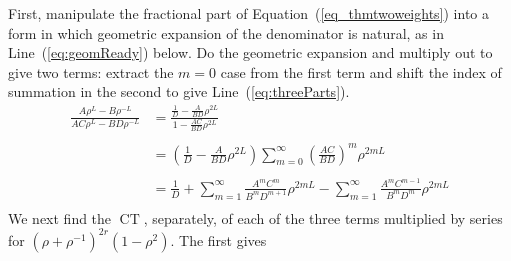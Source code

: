\documentclass[11pt,a4paper]{article}
\DeclareMathOperator{\CT}{CT}
\newcommand{\p}{\rho}
\begin{document}
First, manipulate the fractional part of Equation~(\ref{eq_thmtwoweights}) into a form in which geometric expansion of the denominator is natural, as in Line~(\ref{eq:geomReady}) below.  Do the geometric expansion and multiply out to give two terms: extract the $m=0$ case from the first term and shift the index of summation in the second to give Line~(\ref{eq:threeParts}).
\begin{align}
\frac{A \p^L - B \p^{-L}}{AC \p^L - BD \p ^{-L}}
&=  
\frac{\frac{1}{D}  - \frac{A}{BD} \p^{2L}}{1  - \frac{AC}{BD} \p^{2L}} \label{eq:geomReady}\\
\nonumber \\
&= 
\left(\frac{1}{D}  - \frac{A}{BD} \p^{2L} \right )
\sum_{m=0}^{\infty} \left ( \frac{AC}{BD} \right )^m\p^{2mL}\\
\nonumber \\
&=  \frac{1}{D} + 
\sum_{m=1}^{\infty}  \frac{A^mC^m}{B^mD^{m+1}} \p^{2mL} -
\sum_{m=1}^{\infty}  \frac{A^{m}C^{m-1}}{B^{m}D^{m}} \p^{2mL} 
\nonumber \label{eq:threeParts}\\
\end{align}
We next find the $\CT$, separately, of each of the three terms multiplied by series for $(\p+\p^{-1})^{2r}(1-\p^2)$.  The first gives
\end{document}
